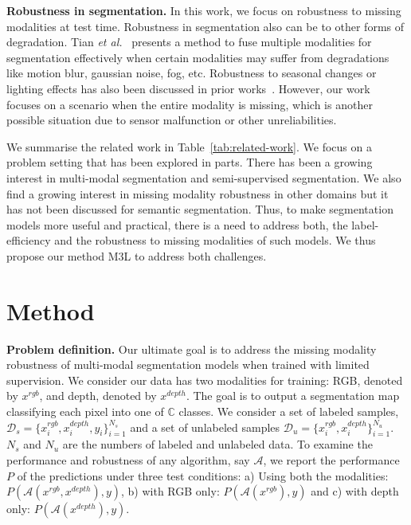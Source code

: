 \documentclass[10pt,twocolumn,letterpaper]{article}
\begin{document}
\noindent\textbf{Robustness in segmentation.} In this work, we focus on robustness to missing modalities at test time. Robustness in segmentation also can be to other forms of degradation. Tian \textit{et al.}~\cite{tian2020uno} presents a method to fuse multiple modalities for segmentation effectively when certain modalities may suffer from degradations like  motion blur, gaussian noise, fog, etc. Robustness to seasonal changes or lighting effects has also been discussed in prior works~\cite{Larsson_2019_CVPR, valada2016towards, 9011192}. However, our work focuses on a scenario when the entire modality is missing, which is another possible situation due to sensor malfunction or other unreliabilities.

We summarise the related work in Table~\ref{tab:related-work}. We focus on a problem setting that has been explored in parts. There has been a growing interest in multi-modal segmentation and semi-supervised segmentation. We also find a growing interest in missing modality robustness in other domains but it has not been discussed for semantic segmentation. Thus, to make segmentation models more useful and practical, there is a need to address both, the label-efficiency and the robustness to missing modalities of such models. We thus propose our method M3L to address both challenges.
 \section{Method}


\noindent\textbf{Problem definition.} Our ultimate goal is to address the missing modality robustness of multi-modal segmentation models when trained with limited supervision. We consider our data has two modalities for training: RGB, denoted by $x^{rgb}$, and depth, denoted by $x^{depth}$. The goal is to output a segmentation map classifying each pixel into one of $\mathbb{C}$ classes.  We consider a set of labeled samples, $\mathcal{D}_s = \{x_i^{rgb}, x_i^{depth}, y_i\}_{i=1}^{N_s}$ and a set of unlabeled samples $\mathcal{D}_u = \{x_i^{rgb}, x_i^{depth}\}_{i=1}^{N_u}$. $N_s$ and $N_u$ are the numbers of labeled and unlabeled data.
To examine the performance and robustness of any algorithm, say $\mathcal{A}$, we report the performance $P$ of the predictions under three test conditions: a) Using both the modalities: $P(\mathcal{A}(x^{rgb}, x^{depth}), y)$, b) with RGB only: $P(\mathcal{A}(x^{rgb}), y)$ and c) with depth only: 
$P(\mathcal{A}(x^{depth}), y)$.
\end{document}
